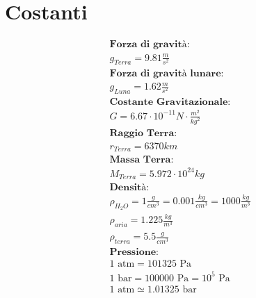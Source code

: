 \section{Costanti}

\begin{gather*}
    \textbf{Forza di gravità: } \\ g_{Terra} = 9.81 \frac{m}{s^2} \\
    \textbf{Forza di gravità lunare: } \\ g_{Luna} = 1.62 \frac{m}{s^2} \\
    \textbf{Costante Gravitazionale: } \\
    G = 6.67 \cdot 10^{-11} N \cdot \frac{m^2}{kg^2} \\
    \textbf{Raggio Terra: } \\ r_{Terra} = 6370 km \\
    \textbf{Massa Terra: } \\ M_{Terra} = 5.972 \cdot 10^{24} kg \\
    \textbf{Densità: } \\
    \rho_{H_2O} = 1 \frac{g}{cm^3} = 0.001 \frac{kg}{cm^3} = 1000 \frac{kg}{m^3} \\
    \rho_{aria} = 1.225 \frac{kg}{m^3} \\
    \rho_{terra} = 5.5 \frac{g}{cm^3} \\
    \textbf{Pressione: } \\
    1 \text{ atm} = 101 325 \text{ Pa} \\
    1 \text{ bar} = 100 000 \text{ Pa} = 10^5 \text{ Pa} \\
    1 \text{ atm} \simeq 1.01325 \text{ bar}
\end{gather*}